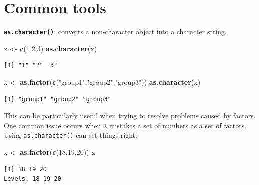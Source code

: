 \documentclass[
]{book}
\newenvironment{Shaded}{\begin{snugshade}}{\end{snugshade}}
\newcommand{\DecValTok}[1]{\textcolor[rgb]{0.00,0.00,0.81}{#1}}
\newcommand{\KeywordTok}[1]{\textcolor[rgb]{0.13,0.29,0.53}{\textbf{#1}}}
\newcommand{\NormalTok}[1]{#1}
\newcommand{\StringTok}[1]{\textcolor[rgb]{0.31,0.60,0.02}{#1}}
\begin{document}
\hypertarget{common-tools}{%
\section*{Common tools}\label{common-tools}}

\textbf{\texttt{as.character()}}: converts a non-character object into a character string.

\begin{Shaded}
\begin{Highlighting}[]
\NormalTok{x <-}\StringTok{ }\KeywordTok{c}\NormalTok{(}\DecValTok{1}\NormalTok{,}\DecValTok{2}\NormalTok{,}\DecValTok{3}\NormalTok{)}
\KeywordTok{as.character}\NormalTok{(x)}
\end{Highlighting}
\end{Shaded}

\begin{verbatim}
[1] "1" "2" "3"
\end{verbatim}

\begin{Shaded}
\begin{Highlighting}[]
\NormalTok{x <-}\StringTok{ }\KeywordTok{as.factor}\NormalTok{(}\KeywordTok{c}\NormalTok{(}\StringTok{"group1"}\NormalTok{,}\StringTok{"group2"}\NormalTok{,}\StringTok{"group3"}\NormalTok{))}
\KeywordTok{as.character}\NormalTok{(x)}
\end{Highlighting}
\end{Shaded}

\begin{verbatim}
[1] "group1" "group2" "group3"
\end{verbatim}

This can be particularly useful when trying to resolve problems caused by factors. One common issue occurs when \texttt{R} mistakes a set of numbers as a set of factors. Using \texttt{as.character()} can set things right:

\begin{Shaded}
\begin{Highlighting}[]
\NormalTok{x <-}\StringTok{ }\KeywordTok{as.factor}\NormalTok{(}\KeywordTok{c}\NormalTok{(}\DecValTok{18}\NormalTok{,}\DecValTok{19}\NormalTok{,}\DecValTok{20}\NormalTok{))}
\NormalTok{x}
\end{Highlighting}
\end{Shaded}

\begin{verbatim}
[1] 18 19 20
Levels: 18 19 20
\end{verbatim}
\end{document}
